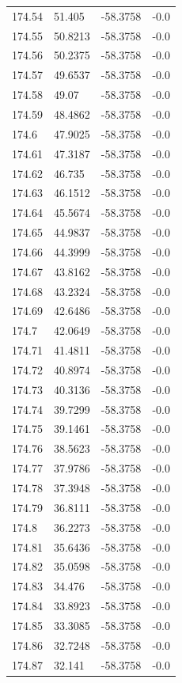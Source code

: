 \begin{table}[H]
\begin{tabular}{llll}
174.54 & 51.405 & -58.3758 & -0.0 \\
174.55 & 50.8213 & -58.3758 & -0.0 \\
174.56 & 50.2375 & -58.3758 & -0.0 \\
174.57 & 49.6537 & -58.3758 & -0.0 \\
174.58 & 49.07 & -58.3758 & -0.0 \\
174.59 & 48.4862 & -58.3758 & -0.0 \\
174.6 & 47.9025 & -58.3758 & -0.0 \\
174.61 & 47.3187 & -58.3758 & -0.0 \\
174.62 & 46.735 & -58.3758 & -0.0 \\
174.63 & 46.1512 & -58.3758 & -0.0 \\
174.64 & 45.5674 & -58.3758 & -0.0 \\
174.65 & 44.9837 & -58.3758 & -0.0 \\
174.66 & 44.3999 & -58.3758 & -0.0 \\
174.67 & 43.8162 & -58.3758 & -0.0 \\
174.68 & 43.2324 & -58.3758 & -0.0 \\
174.69 & 42.6486 & -58.3758 & -0.0 \\
174.7 & 42.0649 & -58.3758 & -0.0 \\
174.71 & 41.4811 & -58.3758 & -0.0 \\
174.72 & 40.8974 & -58.3758 & -0.0 \\
174.73 & 40.3136 & -58.3758 & -0.0 \\
174.74 & 39.7299 & -58.3758 & -0.0 \\
174.75 & 39.1461 & -58.3758 & -0.0 \\
174.76 & 38.5623 & -58.3758 & -0.0 \\
174.77 & 37.9786 & -58.3758 & -0.0 \\
174.78 & 37.3948 & -58.3758 & -0.0 \\
174.79 & 36.8111 & -58.3758 & -0.0 \\
174.8 & 36.2273 & -58.3758 & -0.0 \\
174.81 & 35.6436 & -58.3758 & -0.0 \\
174.82 & 35.0598 & -58.3758 & -0.0 \\
174.83 & 34.476 & -58.3758 & -0.0 \\
174.84 & 33.8923 & -58.3758 & -0.0 \\
174.85 & 33.3085 & -58.3758 & -0.0 \\
174.86 & 32.7248 & -58.3758 & -0.0 \\
174.87 & 32.141 & -58.3758 & -0.0 \\

\end{tabular}
\end{table}
